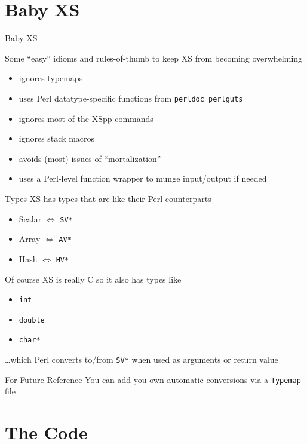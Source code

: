 \documentclass{beamer}
\providecommand{\code}[1]{{\texttt{\scriptsize{#1}}}}
\begin{document}
\section{Baby XS}

\begin{frame}{Baby XS}
  \begin{block}{}
    Some ``easy'' idioms and rules-of-thumb to keep XS from becoming overwhelming
  \end{block}
  \begin{itemize}
    \item ignores typemaps
    \item uses Perl datatype-specific functions from \code{perldoc perlguts}
    \item ignores most of the XSpp commands
    \item ignores stack macros
    \item avoids (most) issues of ``mortalization''
    \item uses a Perl-level function wrapper to munge input/output if needed
  \end{itemize}
\end{frame}

\begin{frame}{Types}
  XS has types that are like their Perl counterparts
  \begin{itemize}
    \item Scalar $\Leftrightarrow$ \code{SV*}
    \item Array $\Leftrightarrow$ \code{AV*}
    \item Hash $\Leftrightarrow$ \code{HV*}
  \end{itemize}
  Of course XS is really C so it also has types like
  \begin{itemize}
    \item \code{int}
    \item \code{double}
    \item \code{char*}
  \end{itemize}
  \ldots which Perl converts to/from \code{SV*} when used as arguments or return value
  \begin{block}{For Future Reference}
    You can add you own automatic conversions via a \code{Typemap} file
  \end{block}
\end{frame}

\section{The Code}
\end{document}
